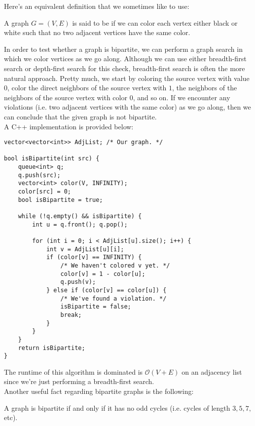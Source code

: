 Here's an equivalent definition that we sometimes like to use:

\begin{definition}
A graph $G = (V, E)$ is said to be  if we can color each vertex either black or white such that no two adjacent vertices have the same color.  
\end{definition}


In order to test whether a graph is bipartite, we can perform a graph search in which we color vertices as we go along. Although we can use either breadth-first search or depth-first search for this check, breadth-first search is often the more natural approach. Pretty much, we start by coloring the source vertex with value $0$, color the direct neighbors of the source vertex with $1$, the neighbors of the neighbors of the source vertex with color $0$, and so on. If we encounter any violations (i.e. two adjacent vertices with the same color) as we go along, then we can conclude that the given graph is not bipartite. \\


A C++ implementation is provided below:


\begin{lstlisting}
vector<vector<int>> AdjList; /* Our graph. */

bool isBipartite(int src) {
    queue<int> q;
    q.push(src);
    vector<int> color(V, INFINITY); 
    color[src] = 0;
    bool isBipartite = true;
    
    while (!q.empty() && isBipartite) {
        int u = q.front(); q.pop();
        
        for (int i = 0; i < AdjList[u].size(); i++) {
            int v = AdjList[u][i];
            if (color[v] == INFINITY) {
                /* We haven't colored v yet. */
                color[v] = 1 - color[u];
                q.push(v); 
            } else if (color[v] == color[u]) {
                /* We've found a violation. */
                isBipartite = false;
                break;
            }
        }
    }
    return isBipartite;
}
\end{lstlisting}

The runtime of this algorithm is dominated is $\mathcal{O}(V + E)$ on an adjacency list since we're just performing a breadth-first search. \\

Another useful fact regarding bipartite graphs is the following:

\begin{fact}
A graph is bipartite if and only if it has no odd cycles (i.e. cycles of length $3, 5, 7,$ etc).
\end{fact}